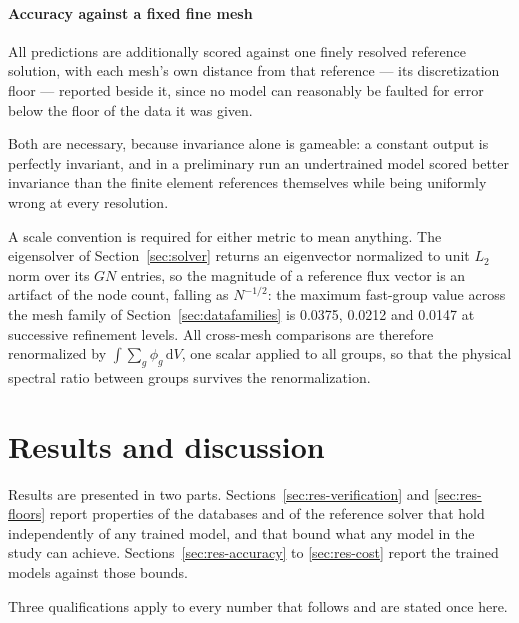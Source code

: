 \documentclass[preprint,12pt]{elsarticle}
\begin{document}
\paragraph{Accuracy against a fixed fine mesh} All predictions are additionally
scored against one finely resolved reference solution, with each mesh's own
distance from that reference --- its discretization floor --- reported beside
it, since no model can reasonably be faulted for error below the floor of the
data it was given.

Both are necessary, because invariance alone is gameable: a constant output is
perfectly invariant, and in a preliminary run an undertrained model scored
better invariance than the finite element references themselves while being
uniformly wrong at every resolution.

A scale convention is required for either metric to mean anything. The
eigensolver of Section~\ref{sec:solver} returns an eigenvector normalized to
unit $L_2$ norm over its $GN$ entries, so the magnitude of a reference flux
vector is an artifact of the node count, falling as $N^{-1/2}$: the maximum
fast-group value across the mesh family of Section~\ref{sec:datafamilies} is
0.0375, 0.0212 and 0.0147 at successive refinement levels. All cross-mesh
comparisons are therefore renormalized by $\int \sum_g \phi_g \,\mathrm{d}V$,
one scalar applied to all groups, so that the physical spectral ratio between
groups survives the renormalization.

\section{Results and discussion}
\label{sec:results}

Results are presented in two parts. Sections~\ref{sec:res-verification} and
\ref{sec:res-floors} report properties of the databases and of the reference
solver that hold independently of any trained model, and that bound what any
model in the study can achieve. Sections~\ref{sec:res-accuracy} to
\ref{sec:res-cost} report the trained models against those bounds.

Three qualifications apply to every number that follows and are stated once
here.
\end{document}
